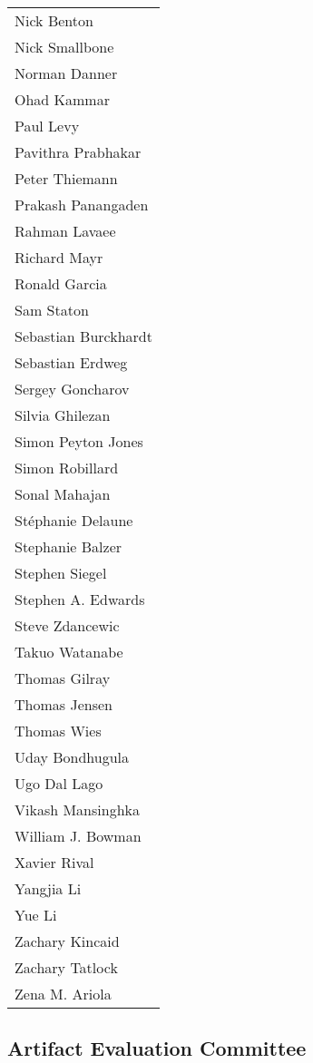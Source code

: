 \begin{tabular}[t]{@{}p{\namewidth}}
Nick Benton \\
Nick Smallbone \\
Norman Danner \\
Ohad Kammar \\
Paul Levy \\
Pavithra Prabhakar \\
Peter Thiemann \\
Prakash Panangaden \\
Rahman Lavaee \\
Richard Mayr \\
Ronald Garcia \\
Sam Staton \\
Sebastian Burckhardt \\
Sebastian Erdweg \\
Sergey Goncharov \\
Silvia Ghilezan \\
Simon Peyton Jones \\
Simon Robillard \\
Sonal Mahajan \\
St\'{e}phanie Delaune \\
Stephanie Balzer \\
Stephen  Siegel \\
Stephen A. Edwards \\
Steve Zdancewic \\
Takuo Watanabe \\
Thomas Gilray \\
Thomas Jensen \\
Thomas Wies \\
Uday Bondhugula \\
Ugo Dal Lago \\
Vikash Mansinghka \\
William J. Bowman \\
Xavier Rival \\
Yangjia Li \\
Yue Li \\
Zachary Kincaid \\
Zachary Tatlock \\
Zena M. Ariola
\end{tabular}

\subsection*{\sffamily Artifact Evaluation Committee}

